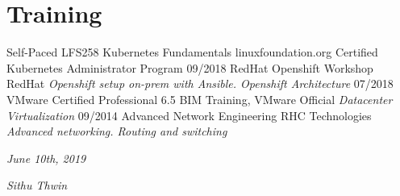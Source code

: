 \documentclass[]{friggeri-cv}
\begin{document}
\section{Training}
\begin{entrylist}
	\entry
	{Self-Paced}
	{LFS258 Kubernetes Fundamentals}
	{linuxfoundation.org}
	{Certified Kubernetes Administrator Program}
	\entry
	{09/2018}
	{RedHat Openshift Workshop}
	{RedHat}
	{\emph{Openshift setup on-prem with Ansible. Openshift Architecture}}	\entry
	{07/2018}
	{VMware Certified Professional 6.5}
	{BIM Training, VMware Official}
	{\emph{Datacenter Virtualization}}
	\entry
	{09/2014}
	{Advanced Network Engineering}
	{RHC Technologies}
	{\emph{Advanced networking. Routing and switching}}
\end{entrylist}

\begin{flushleft}
\emph{June 10th, 2019}
\end{flushleft}
\begin{flushright}
\emph{Sithu Thwin}
\end{flushright}
\end{document}
